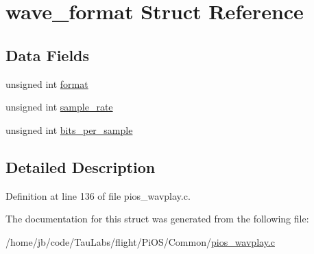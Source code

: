 \hypertarget{structwave__format}{\section{wave\-\_\-format \-Struct \-Reference}
\label{structwave__format}
}
\subsection*{\-Data \-Fields}
\begin{DoxyCompactItemize}
\item 
unsigned int \hyperlink{group___w_a_v_e_p_l_a_y_e_r___private___variables_ga9d1757773fade2368a9707940f73a817}{format}
\item 
unsigned int \hyperlink{group___w_a_v_e_p_l_a_y_e_r___private___variables_gac4e6a65b9847e9764ced1595404b75fe}{sample\-\_\-rate}
\item 
unsigned int \hyperlink{group___w_a_v_e_p_l_a_y_e_r___private___variables_gad262ae00b4298e98bbbd565de116f390}{bits\-\_\-per\-\_\-sample}
\end{DoxyCompactItemize}


\subsection{\-Detailed \-Description}


\-Definition at line 136 of file pios\-\_\-wavplay.\-c.



\-The documentation for this struct was generated from the following file\-:\begin{DoxyCompactItemize}
\item 
/home/jb/code/\-Tau\-Labs/flight/\-Pi\-O\-S/\-Common/\hyperlink{pios__wavplay_8c}{pios\-\_\-wavplay.\-c}\end{DoxyCompactItemize}
